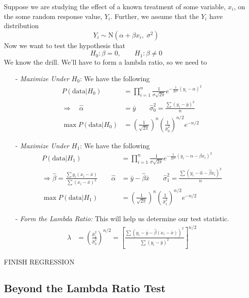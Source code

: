 \documentclass[a4paper,12pt]{scrartcl}
\begin{document}
Suppose we are studying the effect of a known treatment of some 
variable, $x_i$, on the some random response value, $Y_i$.
Further, we assume that the $Y_i$ have distribution
   \[ Y_i \sim \text{N}(\alpha + \beta x_i,\; \sigma^2) \]
Now we want to test the hypothesis that 
   \[ H_0: \beta = 0, \qquad H_1: \beta \neq 0 \]
We know the drill. We'll have to form a lambda ratio, so we need to
\begin{itemize}
   \item[-] {\sl Maximize Under $H_0$}: We have the following
      \begin{align*}
	 P(\text{data} | H_0) &= \prod^n_{i=1} \frac{1}{
	    \sigma\sqrt{2\pi}} e^{-\frac{1}{2\sigma^2} 
	    (y_i - \alpha)^2} \\
	    \Rightarrow \quad \hat{\alpha} &= \bar{y} \qquad
	    \hat{\sigma}^2_0 = \frac{\sum (y_i - \bar{y})^2}{n}\\
	 \max P(\text{data} | H_0) &= \left(\frac{1}{\sqrt{2\pi}}
	    \right)^n \left(\frac{1}{\hat{\sigma}_0^2}\right)^{n/2}
	    e^{-n/2}
      \end{align*}
   \item[-] {\sl Maximize Under $H_1$}: We have the following
      \begin{align*}
	 P(\text{data} | H_1) &= \prod^n_{i=1} \frac{1}{
	    \sigma\sqrt{2\pi}} e^{-\frac{1}{2\sigma^2} 
	    (y_i - \alpha - \beta x_i)^2} \\
	 \Rightarrow \hat{\beta} = \frac{\sum y_i(x_i - \bar{x})}{
	    \sum (x_i - \bar{x})^2} \qquad \hat{\alpha} &= \bar{y}-
	    \hat{\beta} \bar{x} \qquad \hat{\sigma}^2_1 = 
	    \frac{\sum(y_i - \hat{\alpha} - \hat{\beta}x_i)^2}{n}\\
	 \max P(\text{data} | H_1) &= \left(\frac{1}{\sqrt{2\pi}}
	    \right)^n \left(\frac{1}{\hat{\sigma}_1^2}\right)^{n/2}
	    e^{-n/2}
      \end{align*}
   \item[-] {\sl Form the Lambda Ratio:} This will help us determine
      our test statistic.
      \begin{align*}
	 \lambda &= \left(\frac{\hat{\sigma}^2_1}{\hat{\sigma}^2_0}
	    \right)^{n/2} = \left[ \frac{
	       \sum(y_i - \bar{y} - \hat{\beta}(x_i-\bar{x}))^2}{
	       \sum (y_i - \bar{y})^2}\right]^{n/2}
      \end{align*}
\end{itemize}
FINISH REGRESSION



\newpage
\subsection{Beyond the Lambda Ratio Test}
\end{document}
